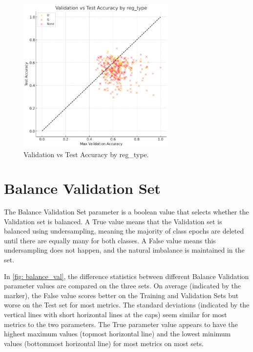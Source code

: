 \begin{figure}[H]
    \centering
    \includegraphics[width=0.7\textwidth]{Figures/results/scatter_reg_type_part_3.png}
    \caption{Validation vs Test Accuracy by reg\_type.}
    \label{fig: reg_type_scatter_part_3}
\end{figure}


\section{Balance Validation Set}
\label{res_sec: balance_val}
The Balance Validation Set parameter is a boolean value that selects whether the Validation set is balanced. A True value means that the Validation set is balanced using undersampling, meaning the majority of class epochs are deleted until there are equally many for both classes. A False value means this undersampling does not happen, and the natural imbalance is maintained in the set. 

In \autoref{fig: balance_val}, the difference statistics between different Balance Validation parameter values are compared on the three sets. On average (indicated by the marker), the False value scores better on the Training and Validation Sets but worse on the Test set for most metrics. The standard deviations (indicated by the vertical lines with short horizontal lines at the caps) seem similar for most metrics to the two parameters. The True parameter value appears to have the highest maximum values (topmost horizontal line) and the lowest minimum values (bottommost horizontal line) for most metrics on most sets.


